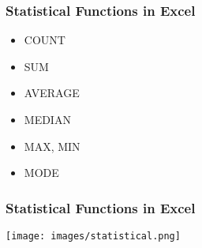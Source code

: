 \documentclass[11pt]{beamer}
\begin{document}
\begin{frame}
 \frametitle{Statistical Functions in Excel}
\begin{itemize}
\item \alert{COUNT}
\item \alert{SUM}
\item \alert{AVERAGE}
\item \alert{MEDIAN}
\item \alert{MAX, MIN}
\item \alert{MODE}
\end{itemize}
\end{frame}

\begin{frame}
\begin{center}
 \frametitle{Statistical Functions in Excel}
\texttt{[image: images/statistical.png]}
\end{center}
\end{frame}
\end{document}
